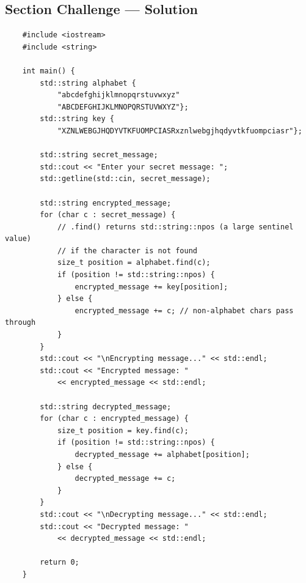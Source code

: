 \subsection{Section Challenge --- Solution}
\begin{lstlisting}
	#include <iostream>
	#include <string>

	int main() {
		std::string alphabet {
			"abcdefghijklmnopqrstuvwxyz"
			"ABCDEFGHIJKLMNOPQRSTUVWXYZ"};
		std::string key {
			"XZNLWEBGJHQDYVTKFUOMPCIASRxznlwebgjhqdyvtkfuompciasr"};

		std::string secret_message;
		std::cout << "Enter your secret message: ";
		std::getline(std::cin, secret_message);

		std::string encrypted_message;
		for (char c : secret_message) {
			// .find() returns std::string::npos (a large sentinel value)
			// if the character is not found
			size_t position = alphabet.find(c);
			if (position != std::string::npos) {
				encrypted_message += key[position];
			} else {
				encrypted_message += c; // non-alphabet chars pass through
			}
		}
		std::cout << "\nEncrypting message..." << std::endl;
		std::cout << "Encrypted message: "
			<< encrypted_message << std::endl;

		std::string decrypted_message;
		for (char c : encrypted_message) {
			size_t position = key.find(c);
			if (position != std::string::npos) {
				decrypted_message += alphabet[position];
			} else {
				decrypted_message += c;
			}
		}
		std::cout << "\nDecrypting message..." << std::endl;
		std::cout << "Decrypted message: "
			<< decrypted_message << std::endl;

		return 0;
	}
\end{lstlisting}

